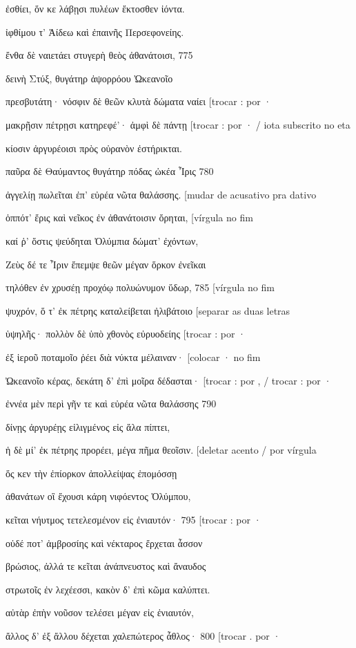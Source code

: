 ἐσθίει, ὅν κε λάβῃσι πυλέων ἔκτοσθεν ἰόντα.

ἰφθίμου τ' Ἀίδεω καὶ ἐπαινῆς Περσεφονείης.

ἔνθα δὲ ναιετάει στυγερὴ θεὸς ἀθανάτοισι, 775

δεινὴ Στύξ, θυγάτηρ ἀψορρόου Ὠκεανοῖο

πρεσβυτάτη· νόσφιν δὲ θεῶν κλυτὰ δώματα ναίει {[}trocar : por ·

μακρῇσιν πέτρῃσι κατηρεφέ'· ἀμφὶ δὲ πάντῃ {[}trocar : por · / iota
subscrito no eta

κίοσιν ἀργυρέοισι πρὸς οὐρανὸν ἐστήρικται.

παῦρα δὲ Θαύμαντος θυγάτηρ πόδας ὠκέα Ἶρις 780

ἀγγελίῃ πωλεῖται ἐπ' εὐρέα νῶτα θαλάσσης. {[}mudar de acusativo pra
dativo

ὁππότ' ἔρις καὶ νεῖκος ἐν ἀθανάτοισιν ὄρηται, {[}vírgula no fim

καί ῥ' ὅστις ψεύδηται Ὀλύμπια δώματ' ἐχόντων,

Ζεὺς δέ τε Ἶριν ἔπεμψε θεῶν μέγαν ὅρκον ἐνεῖκαι

τηλόθεν ἐν χρυσέῃ προχόῳ πολυώνυμον ὕδωρ, 785 {[}vírgula no fim

ψυχρόν, ὅ τ' ἐκ πέτρης καταλείβεται ἠλιβάτοιο {[}separar as duas letras

ὑψηλῆς· πολλὸν δὲ ὑπὸ χθονὸς εὐρυοδείης {[}trocar : por ·

ἐξ ἱεροῦ ποταμοῖο ῥέει διὰ νύκτα μέλαιναν· {[}colocar · no fim

Ὠκεανοῖο κέρας, δεκάτη δ' ἐπὶ μοῖρα δέδασται· {[}trocar : por , / trocar
: por ·

ἐννέα μὲν περὶ γῆν τε καὶ εὐρέα νῶτα θαλάσσης 790

δίνῃς ἀργυρέῃς εἱλιγμένος εἰς ἅλα πίπτει,

ἡ δὲ μί' ἐκ πέτρης προρέει, μέγα πῆμα θεοῖσιν. {[}deletar acento / por
vírgula

ὅς κεν τὴν ἐπίορκον ἀπολλείψας ἐπομόσσῃ

ἀθανάτων οἳ ἔχουσι κάρη νιφόεντος Ὀλύμπου,

κεῖται νήυτμος τετελεσμένον εἰς ἐνιαυτόν· 795 {[}trocar : por ·

οὐδέ ποτ' ἀμβροσίης καὶ νέκταρος ἔρχεται ἆσσον

βρώσιος, ἀλλά τε κεῖται ἀνάπνευστος καὶ ἄναυδος

στρωτοῖς ἐν λεχέεσσι, κακὸν δ' ἐπὶ κῶμα καλύπτει.

αὐτὰρ ἐπὴν νοῦσον τελέσει μέγαν εἰς ἐνιαυτόν,

ἄλλος δ' ἐξ ἄλλου δέχεται χαλεπώτερος ἆθλος· 800 {[}trocar . por ·

